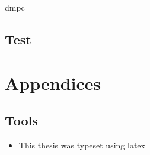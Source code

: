 \documentclass{these-dbl}
\begin{document}
\gls{dmpc}

\cite{YangEtAl2022}
\printbibliography%


\chapter{Test}
\cite{AlessioBemporad2009}
\cite{YangEtAl2022}
\printbibliography%


\appendix
\part{Appendices}
\chapter{Tools}
\begin{itemize}
  \item This thesis was typeset using \gls{latex}

\end{itemize}




\makebackcover
\end{document}
